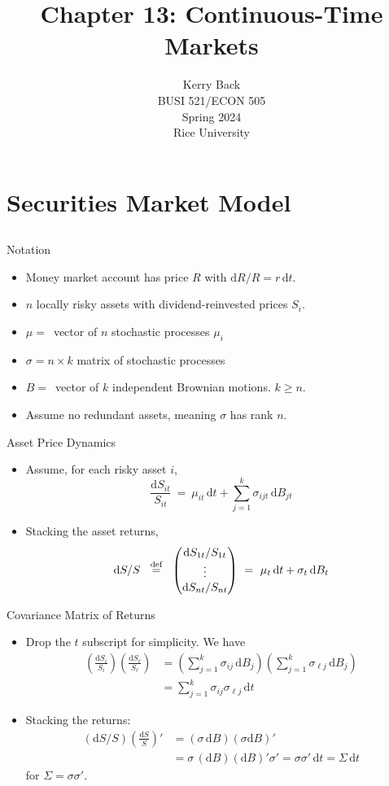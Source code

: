 \documentclass[10pt]{beamer}
\title{Chapter 13: Continuous-Time Markets}
\date{}
\author{Kerry Back\\ 
BUSI 521/ECON 505\\
Spring 2024\\
Rice University}
\newcommand{\bi}{\begin{itemize}}
\newcommand{\ei}{\end{itemize}}
\newcommand{\im}{\item}
\newcommand{\D}{\mathrm{d}}
\newcommand{\eqdef}{\;\buildrel \text{d{}ef}\over = \;}
\begin{document}
\maketitle


\section{Securities Market Model}
\subsection{}

\begin{frame}{Notation}
\bi 
\im 
 Money market account has price $R$ with $\D R/R = r\,\D t$. 
 \im $n$ locally risky assets with dividend-reinvested prices $S_i$.
\im $\mu=\,$ vector of $n$ stochastic processes $\mu_i$
\im  $\sigma=n \times k$ matrix of stochastic processes
 \im $B =\,$ vector of $k$ independent Brownian motions.  $k \geq n$. 
 \im Assume no redundant assets, meaning $\sigma$ has rank $n$.
\ei 
\end{frame}


\begin{frame}{Asset Price Dynamics}

    \bi 
    \im Assume, for each risky asset $i$,
   $$\frac{\D S_{it}}{S_{it}} \ = \  \mu_{it}\,\D t + \sum_{j=1}^k \sigma_{ijt}\,\D B_{jt}$$
   \im Stacking the asset returns,
  $$\D S/S \ \eqdef \ \begin{pmatrix}\D S_{1t}/S_{1t} \\ \vdots \\ \D S_{nt}/S_{nt} \end{pmatrix}\ = \  \mu_t\,\D t + \sigma_t\,\D B_t $$
\ei

\end{frame}


\begin{frame}{Covariance Matrix of Returns}
    \bi 
    \im Drop the $t$ subscript for simplicity.  We have
    \begin{align*} 
        \left(\frac{\D S_{i}}{S_{i}}\right)\left(\frac{\D S_{\ell }}{S_{\ell }}\right) 
        &= \left(\sum_{j=1}^k \sigma_{ij}\,\D B_{j}\right)\left(\sum_{j=1}^k \sigma_{\ell j}\,\D B_{j}\right)\\
        &= \sum_{j=1}^k \sigma_{ij}\sigma_{\ell j}\,\D t
    \end{align*}
 
    \im Stacking the returns:
    \begin{align*}
        \left(\D S / S\right)\left(\frac{\D S}{S}\right)' &= (\sigma\,\D B)(\sigma \D B)' \\
        &= \sigma \,(\D B)(\D B)'\sigma' = \sigma \sigma'\,\D t = \Sigma\,\D t
    \end{align*}
    for $\Sigma = \sigma \sigma'$.
    \ei

\end{frame}
\end{document}
